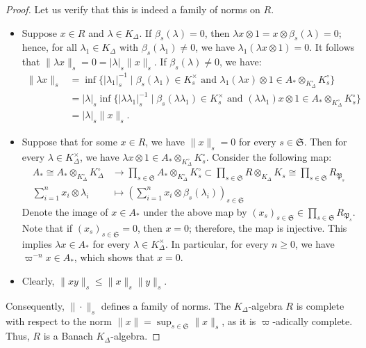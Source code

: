 \documentclass[12pts,a4paper]{amsart}
\begin{document}
\begin{proof}
Let us verify that this is indeed a family of norms on $R$.
\begin{itemize}
\item Suppose $x \in R$ and $\lambda \in K_\Delta$. If $\beta_s(\lambda) = 0$, then $\lambda x \otimes 1 = x \otimes \beta_s(\lambda) = 0$; hence, for all $\lambda_1 \in K_\Delta$ with $\beta_s(\lambda_1) \neq 0$, we have $\lambda_1(\lambda x \otimes 1) = 0$. It follows that $\|\lambda x\|_s = 0 = |\lambda|_s \|x\|_s$. If $\beta_s(\lambda) \neq 0$, we have:
\begin{align*}
    \|\lambda x\|_s &= \inf \{ |\lambda_1|^{-1}_s \mid \beta_s(\lambda_1) \in K^\times_s \text{ and } \lambda_1(\lambda x) \otimes 1 \in A_* \otimes_{K^\circ_\Delta} K^\circ_s \} \\
    &= |\lambda|_s \inf \{ |\lambda \lambda_1|^{-1}_s \mid \beta_s(\lambda \lambda_1) \in K^\times_s \text{ and } (\lambda \lambda_1) x \otimes 1 \in A_* \otimes_{K^\circ_\Delta} K^\circ_s \} \\
    &= |\lambda|_s \|x\|_s.
\end{align*}

\item Suppose that for some $x \in R$, we have $\|x\|_s = 0$ for every $s \in \mathfrak{S}$. Then for every $\lambda \in K^\times_\Delta$, we have $\lambda x \otimes 1 \in A_* \otimes_{K^\circ_\Delta} K^\circ_s$. Consider the following map:
\begin{align*}
    A_* \cong A_* \otimes_{K^\circ_\Delta} K^\circ_\Delta &\to \prod_{s \in \mathfrak{S}} A_* \otimes_{K^\circ_\Delta} K^\circ_s \subset \prod_{s \in \mathfrak{S}} R \otimes_{K_\Delta} K_s \cong \prod_{s \in \mathfrak{S}} R_{\mathfrak{P}_s} \\
    \sum_{i=1}^n x_i \otimes \lambda_i &\mapsto \left( \sum_{i=1}^n x_i \otimes \beta_s(\lambda_i) \right)_{s \in \mathfrak{S}}
\end{align*}
Denote the image of $x \in A_*$ under the above map by $(x_s)_{s \in \mathfrak{S}} \in \prod_{s \in \mathfrak{S}} R_{\mathfrak{P}_s}$. Note that if $(x_s)_{s \in \mathfrak{S}} = 0$, then $x = 0$; therefore, the map is injective. This implies $\lambda x \in A_*$ for every $\lambda \in K^\times_\Delta$. In particular, for every $n \geq 0$, we have $\varpi^{-n} x \in A_*$, which shows that $x = 0$.

\item Clearly, $\|xy\|_s \leq \|x\|_s \|y\|_s$.
\end{itemize}

Consequently, $\|\cdot\|_s$ defines a family of norms. The $K_\Delta$-algebra $R$ is complete with respect to the norm $\|x\| = \sup_{s \in \mathfrak{S}} \|x\|_s$, as it is $\varpi$-adically complete. Thus, $R$ is a Banach $K_\Delta$-algebra.



\end{proof}
\end{document}
